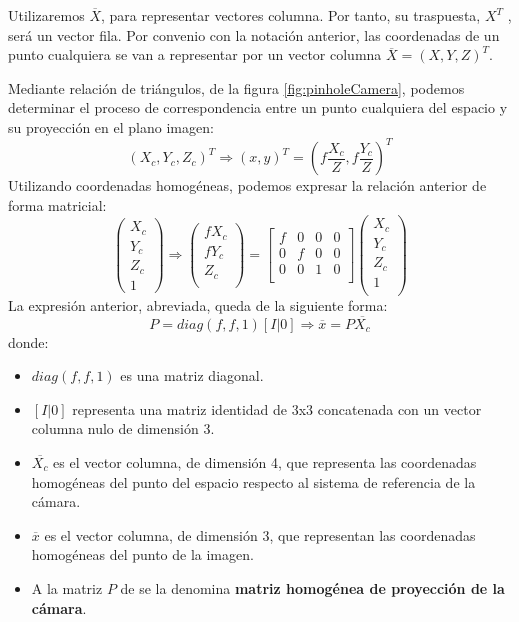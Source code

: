 Utilizaremos $\overline{X}$, para representar vectores columna. Por tanto, su traspuesta, $X^T$ , será un vector fila. Por convenio con la notación anterior, las coordenadas de un punto cualquiera se van a representar por un vector columna $\overline{X} = (X, Y, Z)^T$.

Mediante relación de triángulos, de la figura \ref{fig:pinholeCamera}, podemos determinar el proceso de correspondencia entre un punto cualquiera del espacio y su proyección en el plano imagen:
\begin{equation}
  (X_c , Y_c , Z_c )^T \Longrightarrow  (x, y)^T = (f \dfrac{X_c}{Z}, f \dfrac{Y_c}{Z})^T
\end{equation}
Utilizando coordenadas homogéneas, podemos expresar la relación anterior de forma matricial:
\begin{equation}
  \begin{pmatrix}
    X_{c} \\
    Y_{c} \\
    Z_{c} \\
    1
  \end{pmatrix}
  \Longrightarrow
  \begin{pmatrix}
    fX_{c} \\
    fY_{c} \\
    Z_{c} \\
  \end{pmatrix}
  =
  \begin{bmatrix} f & 0 & 0 & 0 \\ 0 & f & 0 & 0 \\ 0 & 0 & 1 & 0 \\\end{bmatrix}
  \begin{pmatrix} X_{c} \\  Y_{c} \\  Z_{c} \\  1 \\\end{pmatrix}
\end{equation}
La expresión anterior, abreviada, queda de la siguiente forma:
\begin{equation}
  P = diag(f, f, 1) [I|0] \Longrightarrow  \overline{x} = P\overline{X_c}
\end{equation}
donde:
\begin{itemize}
\item $diag(f, f, 1)$ es una matriz diagonal.
\item $[I|0]$ representa una matriz identidad de 3x3 concatenada con un vector columna nulo de dimensión 3.
\item $\overline{X_c}$  es el vector columna, de dimensión 4, que representa las coordenadas homogéneas del punto del espacio respecto al sistema de referencia de la cámara.
\item $\overline{x}$  es el vector columna, de dimensión 3, que representan las coordenadas homogéneas del punto de la imagen.
\item A la matriz $P$ de se la denomina \textbf{matriz homogénea de proyección de la cámara}.
\end{itemize}

